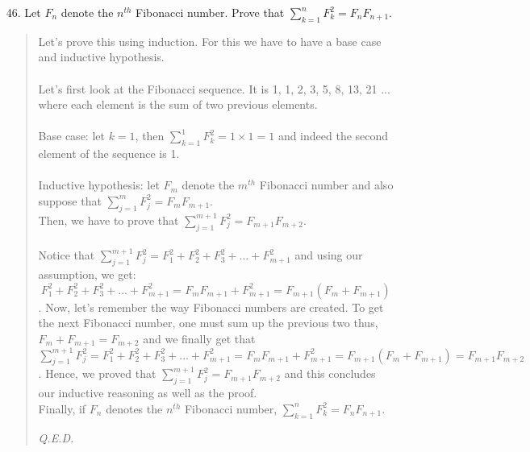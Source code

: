 \documentclass[12pt, a4paper]{article}                      %
\begin{document}
\begin{itemize}
\item[46.]
Let $F_n$ denote the $n^{th}$ Fibonacci number. Prove that $\displaystyle\sum_{k=1}^{n} F^2_k = F_nF_{n + 1}$.
\begin{quote}
Let's prove this using induction. For this we have to have a base case and inductive hypothesis.\\\\
Let's first look at the Fibonacci sequence. It is 1, 1, 2, 3, 5, 8, 13, 21 ... where each element is the
sum of two previous elements.\\\\
Base case: let $k = 1$, then $\displaystyle\sum_{k=1}^{1} F^2_k = 1 \times 1 = 1$ and indeed the second
element of the sequence is 1.\\\\
Inductive hypothesis: let $F_m$ denote the $m^{th}$ Fibonacci number and also suppose that $\displaystyle\sum_{j=1}^{m} F^2_j = F_mF_{m + 1}$.\\
Then, we have to prove that $\displaystyle\sum_{j=1}^{m + 1} F^2_j = F_{m + 1}F_{m + 2}$.\\\\
Notice that $\displaystyle\sum_{j=1}^{m + 1} F^2_j = F_1^2 + F_2^2 + F_3^2 + ... + F_{m + 1}^2$ and using our assumption, we get:
$$F_1^2 + F_2^2 + F_3^2 + ... + F_{m + 1}^2 = F_mF_{m + 1} + F_{m + 1}^2 = F_{m + 1}(F_m + F_{m + 1})$$.
Now, let's remember the way Fibonacci numbers are created. To get the next Fibonacci number, one must sum up the previous two
thus, $F_m + F_{m + 1} = F_{m + 2}$ and we finally get that $\displaystyle\sum_{j=1}^{m + 1} F^2_j = F_1^2 + F_2^2 + F_3^2 + ... + F_{m + 1}^2 = F_mF_{m + 1} + F_{m + 1}^2 = F_{m + 1}(F_m + F_{m + 1}) = F_{m + 1}F_{m + 2}$.
Hence, we proved that $\displaystyle\sum_{j=1}^{m + 1} F^2_j = F_{m + 1}F_{m + 2}$ and this concludes our inductive reasoning as well as the proof.\\
Finally, if $F_n$ denotes the $n^{th}$ Fibonacci number, $\displaystyle\sum_{k=1}^{n} F^2_k = F_nF_{n + 1}$.
\begin{flushright}
\textit{Q.E.D.}
\end{flushright}
\end{quote}

\item[]


\end{itemize}
\end{document}
